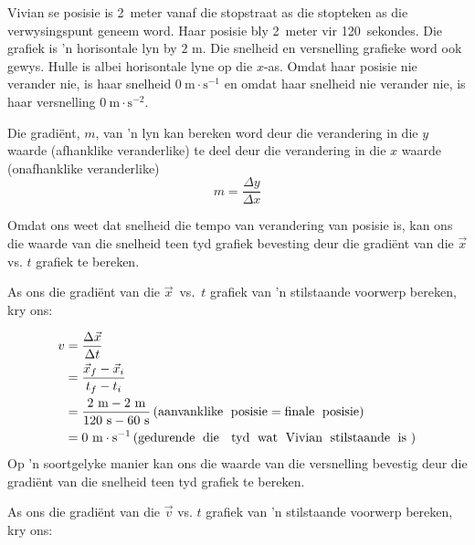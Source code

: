 Vivian se posisie is 2~meter vanaf die stopstraat as die stopteken as die verwysingspunt geneem word. Haar posisie bly 2~meter vir 120~sekondes. Die grafiek is 'n horisontale lyn by $2 \text{ m}$. Die snelheid en versnelling grafieke word ook gewys. Hulle is albei horisontale lyne op die $x$-as. Omdat haar posisie nie verander nie, is haar snelheid $0~\text{m}\ensuremath{\cdot}\text{s}{}^{-1}$ en omdat haar snelheid nie verander nie, is haar versnelling $0~\text{m}\ensuremath{\cdot}\text{s}{}^{-2}$.\par 


\par
{} {Die gradi\"ent, $m$, van 'n lyn kan bereken word deur die verandering in die $y$ waarde (afhanklike veranderlike) te deel deur die verandering in die $x$ waarde (onafhanklike veranderlike) $$m = \frac{\Delta y}{\Delta x}$$ \par  } 

Omdat ons weet dat snelheid die tempo van verandering van posisie is, kan ons die waarde van die snelheid teen tyd grafiek bevesting deur die gradi\"ent van die $\vec{x}$ vs. $t$ grafiek te bereken.\par 

	\par
As ons die gradi\"ent van die $\vec{x}$~vs.~$t$ grafiek van 'n stilstaande voorwerp bereken, kry ons:\par 
        \label{m38795*id69332}\nopagebreak\noindent{}
    \begin{align*}
	v &= \frac{\Delta \vec{x}}{\Delta t}\\
	&= \frac{\vec{x}_{f}-\vec{x}_{i}}{{t}_{f}-{t}_{i}}\\
	&= \frac{2~\text{m}-2~\text{m}}{120~\text{s}-60~\text{s}} \left(\text{aanvanklike\; posisie}=\text{finale\; posisie}\right)\\ 
	&= 0~\text{m}\ensuremath{\cdot}{\text{s}}^{-1}  \left(\text{gedurende\; die \; tyd\; wat\; Vivian\; stilstaande\; is}~\right) \\
      \end{align*}
Op 'n soortgelyke manier kan ons die waarde van die versnelling bevestig deur die gradi\"ent van die snelheid teen tyd grafiek te bereken.\par 

	\par
As ons die gradi\"ent van die $\vec{v}$ vs. $t$ grafiek van 'n stilstaande voorwerp bereken, kry ons:\par 
        \label{m38795*id69594}\nopagebreak\noindent{}
          
